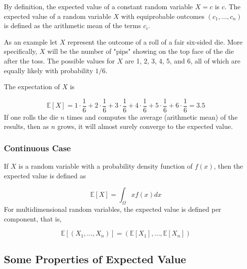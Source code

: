 By definition, the expected value of a constant random variable \(X=c\)
is \(c\). The expected value of a random variable \(X\) with
equiprobable outcomes \((c_{1},\ldots ,c_{n})\) is defined as the
arithmetic mean of the terms \(c_i\). 

As an example let \(X\) represent the outcome of a roll of a fair six-sided die. More
specifically, \(X\) will be the number of "pips" showing on the top face
of the die after the toss. The possible values for \(X\) are 1, 2, 3, 4,
5, and 6, all of which are equally likely with probability \(1/6\).

The expectation of \(X\) is

\begin{equation*}
	\mathbb{E}[X]=1\cdot {\frac {1}{6}}+2\cdot {\frac {1}{6}}+3\cdot {\frac {1}{6}}+4\cdot {\frac {1}{6}}+5\cdot {\frac {1}{6}}+6\cdot {\frac {1}{6}}=3.5
\end{equation*}
If one rolls the die \(n\) times and computes the average (arithmetic
mean) of the results, then as \(n\) grows, it will almost
surely converge to the expected value.

\subsubsection{Continuous Case}
If \(X\) is a random variable with a probability density function of
\(f(x)\), then the expected value is defined as

\begin{equation}
\mathbb{E}[X]=\int_{\Omega}xf(x)dx
\end{equation}
For multidimensional random variables, the expected value is defined
per component, that is,

\begin{equation}
\mathbb{E}[(X_{1},\ldots ,X_{n})]=(\mathbb{E} [X_{1}],\ldots ,\mathbb{E}[X_{n}])
\end{equation}

\subsection{Some Properties of Expected Value}\label{some-properties}

